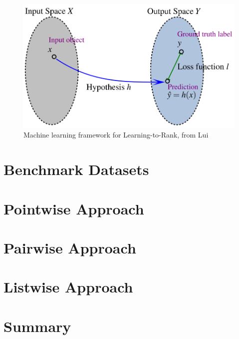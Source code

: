 \begin{description}
\begin{figure}
\includegraphics[scale=0.5]{gfx/descriminative_training}
\caption{Machine learning framework for Learning-to-Rank, from Lui\cite{Liu2007}}
\label{fig:discriminative_training}
\end{figure}

\end{description}
\chapter{Benchmark Datasets}
\chapter{Pointwise Approach}
\chapter{Pairwise Approach}
\chapter{Listwise Approach}
\chapter{Summary}